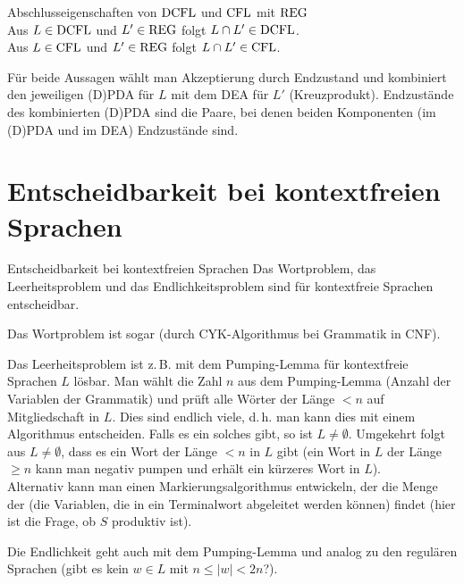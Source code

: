 \linie

\begin{Satz}{Abschlusseigenschaften von $\text{DCFL}$ und $\text{CFL}$ mit $\text{REG}$}\\
    Aus $L \in \text{DCFL}$ und $L' \in \text{REG}$ folgt $L \cap L' \in \text{DCFL}$.\\
    Aus $L \in \text{CFL}$ und $L' \in \text{REG}$ folgt $L \cap L' \in \text{CFL}$.
\end{Satz}

\begin{Beweis}
    Für beide Aussagen wählt man Akzeptierung durch Endzustand und kombiniert
    den jeweiligen (D)PDA für $L$ mit dem DEA für $L'$ (Kreuzprodukt).
    Endzustände des kombinierten (D)PDA sind die Paare, bei denen beiden
    Komponenten (im (D)PDA und im DEA) Endzustände sind.
\end{Beweis}

\pagebreak

\section{%
    Entscheidbarkeit bei kontextfreien Sprachen%
}

\begin{Satz}{Entscheidbarkeit bei kontextfreien Sprachen}
    Das Wortproblem, das Leerheitsproblem und das Endlichkeitsproblem sind
    für kontextfreie Sprachen entscheidbar.
\end{Satz}

\begin{Beweis}
    Das Wortproblem ist sogar 
    (durch CYK-Algorithmus bei Grammatik in CNF).

    Das Leerheitsproblem ist z.\,B. mit dem Pumping-Lemma für kontextfreie
    Sprachen $L$ lösbar.
    Man wählt die Zahl $n$ aus dem Pumping-Lemma
    (Anzahl der Variablen der Grammatik) und prüft alle Wörter der Länge $< n$
    auf Mitgliedschaft in $L$.
    Dies sind endlich viele, d.\,h. man kann dies mit einem Algorithmus
    entscheiden.
    Falls es ein solches gibt, so ist $L \not= \emptyset$.
    Umgekehrt folgt aus $L \not= \emptyset$, dass es ein Wort der Länge $< n$
    in $L$ gibt
    (ein Wort in $L$ der Länge $\ge n$ kann man negativ pumpen und erhält ein
    kürzeres Wort in $L$).\\
    Alternativ kann man einen Markierungsalgorithmus entwickeln, der die
    Menge der 
    (die Variablen, die in ein Terminalwort abgeleitet werden können)
    findet (hier ist die Frage, ob $S$ produktiv ist).

    Die Endlichkeit geht auch mit dem Pumping-Lemma und analog zu den regulären
    Sprachen (gibt es kein $w \in L$ mit $n \le |w| < 2n$?).
\end{Beweis}


